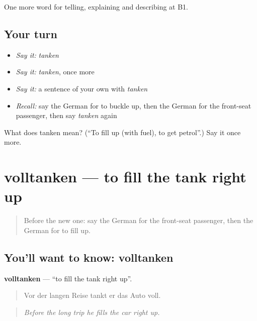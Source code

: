 \begin{grammarlens}[title={What you've built}]
One more word for telling, explaining and describing at B1.
\end{grammarlens}

\subsection*{Your turn}
\begin{itemize}
\raggedright
  \item \emph{Say it:} \emph{tanken}
  \item \emph{Say it:} \emph{tanken}, once more
  \item \emph{Say it:} a sentence of your own with \emph{tanken}
  \item \emph{Recall:} say the German for to buckle up, then the German for the front-seat passenger, then say \emph{tanken} again
\end{itemize}

\begin{tcolorbox}[breakable,colback=teal!4,colframe=teal!35!black,title={Before you move on}]
What does tanken mean? (\textquotedblleft{}To fill up (with fuel), to get petrol\textquotedblright{}.) Say it once more.
\end{tcolorbox}
\section[volltanken]{volltanken — to fill the tank right up}

\label{lesson:GE-C402-volltanken}



\begin{quote}
Before the new one: say the German for the front-seat passenger, then the German for to fill up.
\end{quote}

\subsection*{You'll want to know: volltanken}
\textbf{volltanken} — \textquotedblleft{}to fill the tank right up\textquotedblright{}.

\begin{quote}
Vor der langen Reise tankt er das Auto voll.
\end{quote}

\begin{quote}
\emph{Before the long trip he fills the car right up.}
\end{quote}

